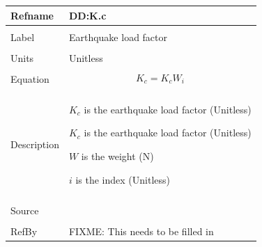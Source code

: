 \documentclass[12pt]{article}
\begin{document}
\noindent \begin{minipage}{\textwidth}
\begin{tabular}{p{} p{}}
\toprule \textbf{Refname} & \textbf{DD:K.c}
\label{DD:K.c}
\\ \midrule \\
Label & Earthquake load factor
\\ \midrule \\
Units & Unitless
\\ \midrule \\
Equation & \begin{dmath}
           {K_{c}}={K_{c}} W_{i}
           \end{dmath}
\\ \midrule \\
Description & \begin{symbDescription}
              \item{${K_{c}}$ is the earthquake load factor (Unitless)}
              \item{${K_{c}}$ is the earthquake load factor (Unitless)}
              \item{$W$ is the weight (N)}
              \item{$i$ is the index (Unitless)}
              \end{symbDescription}
\\ \midrule \\
Source &
\\ \midrule \\
RefBy & FIXME: This needs to be filled in
\\ \bottomrule \end{tabular}
\end{minipage}\\
~\newline
\end{document}
